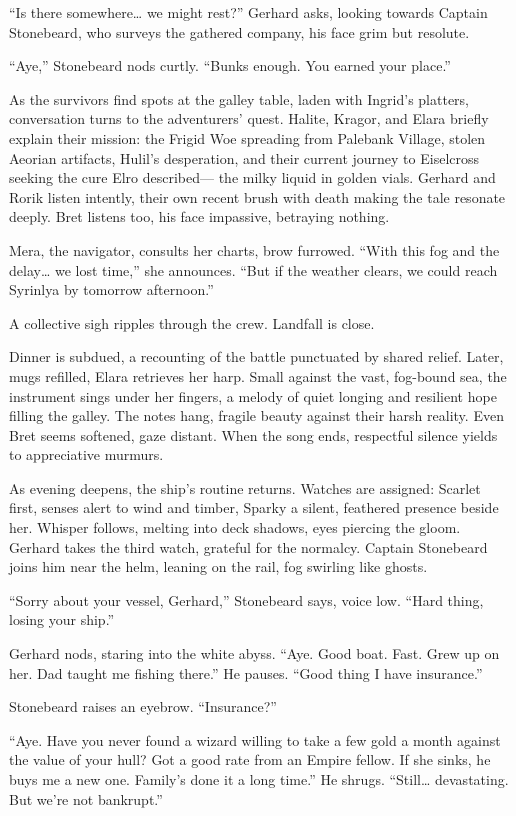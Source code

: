 \documentclass[
  letterpaper,12pt,twoside,twocolumn,openany,
  nodeprecatedcode,bg=full]{dndbook}
\begin{document}
``Is there somewhere\ldots{} we might rest?'' Gerhard asks, looking
towards Captain Stonebeard, who surveys the gathered company, his face
grim but resolute.

``Aye,'' Stonebeard nods curtly. ``Bunks enough. You earned your
place.''

As the survivors find spots at the galley table, laden with Ingrid's
platters, conversation turns to the adventurers' quest. Halite, Kragor,
and Elara briefly explain their mission: the Frigid Woe spreading from
Palebank Village, stolen Aeorian artifacts, Hulil's desperation, and
their current journey to Eiselcross seeking the cure Elro described---
the milky liquid in golden vials. Gerhard and Rorik listen intently,
their own recent brush with death making the tale resonate deeply. Bret
listens too, his face impassive, betraying nothing.

Mera, the navigator, consults her charts, brow furrowed. ``With this fog
and the delay\ldots{} we lost time,'' she announces. ``But if the
weather clears, we could reach Syrinlya by tomorrow afternoon.''

A collective sigh ripples through the crew. Landfall is close.

Dinner is subdued, a recounting of the battle punctuated by shared
relief. Later, mugs refilled, Elara retrieves her harp. Small against
the vast, fog-bound sea, the instrument sings under her fingers, a
melody of quiet longing and resilient hope filling the galley. The notes
hang, fragile beauty against their harsh reality. Even Bret seems
softened, gaze distant. When the song ends, respectful silence yields to
appreciative murmurs.

As evening deepens, the ship's routine returns. Watches are assigned:
Scarlet first, senses alert to wind and timber, Sparky a silent,
feathered presence beside her. Whisper follows, melting into deck
shadows, eyes piercing the gloom. Gerhard takes the third watch,
grateful for the normalcy. Captain Stonebeard joins him near the helm,
leaning on the rail, fog swirling like ghosts.

``Sorry about your vessel, Gerhard,'' Stonebeard says, voice low. ``Hard
thing, losing your ship.''

Gerhard nods, staring into the white abyss. ``Aye. Good boat. Fast. Grew
up on her. Dad taught me fishing there.'' He pauses. ``Good thing I have
insurance.''

Stonebeard raises an eyebrow. ``Insurance?''

``Aye. Have you never found a wizard willing to take a few gold a month
against the value of your hull? Got a good rate from an Empire fellow.
If she sinks, he buys me a new one. Family's done it a long time.'' He
shrugs. ``Still\ldots{} devastating. But we're not bankrupt.''
\end{document}
